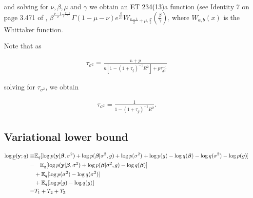 \documentclass{amsart}[12pt]
\begin{document}
and solving for $\nu, \beta, \mu$ and $\gamma$ we obtain an ET 234(13)a function (see Identity 7 on 
page 3.471 of \cite{Gradshteyn1988},
$\beta^{\frac{\nu - 1}{2} \gamma^{\frac{\nu - 1}{2}}} \Gamma(1 - \mu - \nu) e^{\frac{\beta}{2 \gamma}} W_{\frac{\nu - 1}{2} + \mu, \frac{\nu}{2}}\left(\frac{\beta}{\gamma}\right)$, where $W_{a, b}(x)$ is the
Whittaker function.

Note that as

\begin{align*}
	\tau_{\sigma^2} = \frac{n + p}{n[1 - (1 + \tau_g)^{-1} R^2] + p \tau_{\sigma^2}^{-1}} 
\end{align*}

solving for $\tau_{\sigma^2}$, we obtain

\begin{align*}
	\tau_{\sigma^2} = \frac{1}{1 - (1 + \tau_g)^{-1} R^2}. 
\end{align*}

\subsection{Variational lower bound}

\begin{align*}
	\log \underline{p}({\bf y}; q) \equiv & \mathbb{E}_q [\log p({\bf y} | {\boldsymbol \beta}, \sigma^2) + \log p({\boldsymbol \beta} | \sigma^2, g)                        
	+ \log p(\sigma^2) + \log p(g) - \log q({\boldsymbol \beta})
	- \log q(\sigma^2) - \log p(g)] \\
	=                                 & \quad \mathbb{E}_q [\log p({\bf y}| {\boldsymbol \beta}, \sigma^2) + \log p({\boldsymbol \beta} | \sigma^2, g) - \log q({\boldsymbol \beta})] \\
	                                  & + \mathbb{E}_q [\log p(\sigma^2) - \log q(\sigma^2)]                                               \\
	                                  & + \mathbb{E}_q [\log p(g) - \log q(g)]                                                             \\
	=                                 & T_1 + T_2 + T_3                                                                            
\end{align*}
\end{document}
